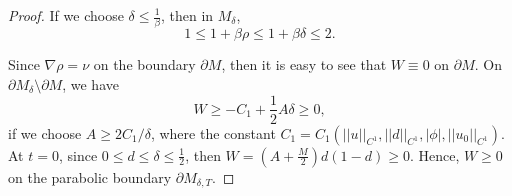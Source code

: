 \documentclass[12pt]{amsart}
\theoremstyle{definition}
\theoremstyle{remark}
\numberwithin{equation}{section}
\begin{document}
\begin{proof}
	
	If we choose $\delta \leq  \frac{1}{\beta}$, then in $M_\delta$,
	\begin{equation}
	1 \leq 1 + \beta \rho \leq 1 + \beta \delta \leq 2.
	\end{equation}
	
	
	Since $\nabla \rho = \nu$ on the boundary $\partial M$, then it is easy to see that $W \equiv 0$ on $\partial M$. On $\partial M_{\delta} \setminus \partial M$, we have
	\begin{equation}
	W  \geq - C_1  + \frac{1}{2} A \delta \geq 0,
	\end{equation}
	if we choose $A \geq 2C_1 / \delta$, where the constant $C_1 = C_1 \left( || u ||_{C^1}, || d||_{C^1}, |\phi|, || u_0||_{C^1} \right)$.
	At $t = 0$, since $0 \leq d \leq \delta \leq \frac{1}{2}$, then $W = (A + \frac{M}{2}) d (1 - d) \geq 0$. Hence, $W \geq 0$ on the parabolic boundary $\partial M_{\delta, T}$. 
	

\end{proof}
\end{document}
